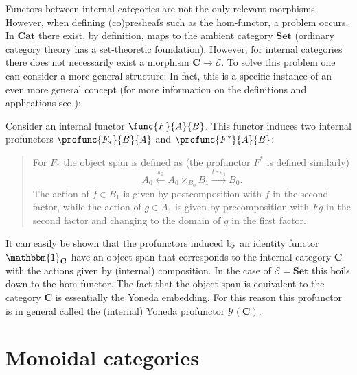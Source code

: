     Functors between internal categories are not the only relevant morphisms. However, when defining (co)presheafs such as the hom-functor, a problem occurs. In $\mathbf{Cat}$ there exist, by definition, maps to the ambient category $\mathbf{Set}$ (ordinary category theory has a set-theoretic foundation). However, for internal categories there does not necessarily exist a morphism $\mathbf{C}\rightarrow\mathcal{E}$. To solve this problem one can consider a more general structure:
    In fact, this is a specific instance of an even more general concept (for more information on the definitions and applications see \cite{maclane, johnstone}):

    \begin{construct}
        Consider an internal functor $\func{F}{A}{B}$. This functor induces two internal profunctors $\profunc{F_*}{B}{A}$ and $\profunc{F^*}{A}{B}$:
        \begin{quote}
            For $F_*$ the object span is defined as (the profunctor $F^*$ is defined similarly) \[A_0\overset{\pi_0}{\longleftarrow}A_0\times_{B_0} B_1\overset{t\circ\pi_1}{\longrightarrow}B_0.\] The action of $f\in B_1$ is given by postcomposition with $f$ in the second factor, while the action of $g\in A_1$ is given by precomposition with $Fg$ in the second factor and changing to the domain of $g$ in the first factor.
        \end{quote}
        It can easily be shown that the profunctors induced by an identity functor $\mathbbm{1}_{\mathbf{C}}$ have an object span that corresponds to the internal category $\mathbf{C}$ with the actions given by (internal) composition. In the case of $\mathcal{E}=\mathbf{Set}$ this boils down to the hom-functor. The fact that the object span is equivalent to the category $\mathbf{C}$ is essentially the Yoneda embedding. For this reason this profunctor is in general called the (internal) Yoneda profunctor $\mathcal{Y}(\mathbf{C})$.
    \end{construct}

\section{Monoidal categories}

